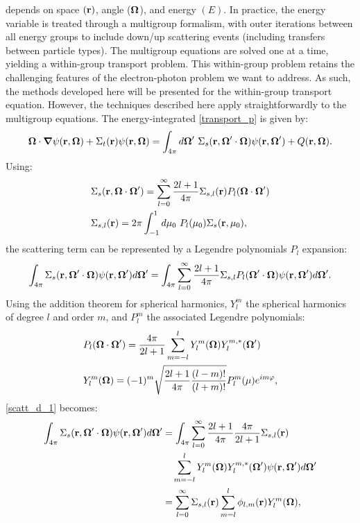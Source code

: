  depends on space $(\mathbf{r})$, angle ($\boldsymbol{\Omega}$), and 
energy $(E)$. In practice, the energy variable is treated through a
multigroup formalism, with outer iterations between all energy groups to
include down/up scattering events (including transfers between particle
types). The multigroup equations are solved one at a time, yielding a
within-group transport problem. This within-group problem retains the 
challenging features of the electron-photon problem we want to address. 
As such, the methods developed here will be presented for the within-group 
transport equation. However, the techniques described here apply 
straightforwardly to the multigroup equations. The energy-integrated 
\cref{transport_p} is given by:
\begin{equation}
\bo\cdot \bn \psi(\br,\bo) + \Sigma_t(\br)\psi(\br,\bo) =
\int_{4\pi}d\bo'\ \Sigma_s(\br,\bo'\cdot\bo)\psi(\br,\bo')+Q(\br,\bo).
\label{transport_p2}
\end{equation}
%
Using:
\begin{align}
  &\Sigma_s(\mathbf{r},\boldsymbol{\Omega}\cdot\boldsymbol{\Omega}') = \sum_{l=0}^{\infty} \frac{2l+1}{4\pi}
  \Sigma_{s,l}(\mathbf{r}) P_l(\boldsymbol{\Omega}\cdot\boldsymbol{\Omega}')\\
  &\Sigma_{s,l}(\mathbf{r}) = 2\pi \int_{-1}^1 d\mu_0\ P_l(\mu_0)
  \Sigma_s(\mathbf{r},\mu_0),
\end{align}
the scattering term can be represented by a Legendre polynomials $P_l$ expansion:
\begin{equation}
  \int_{4\pi} \Sigma_s(\br,\bo'\cdot\bo) \psi(\br,\bo') d\bo' =
  \int_{4\pi} \sum_{l=0}^{\infty} \frac{2l+1}{4\pi} \Sigma_{s,l} P_l(\bo'\cdot\bo)
  \psi(\br,\bo') d\bo'.
  \label{scatt_d_1}
\end{equation}
Using the addition theorem for spherical harmonics, $Y_l^m$ the spherical
harmonics of degree $l$ and order $m$, and $P_l^m$ the associated Legendre
polynomials:
\begin{align}
  & P_l(\boldsymbol{\Omega}\cdot\boldsymbol{\Omega}') = \frac{4\pi}{2l+1} \sum_{m=-l}^l
  Y_l^m(\boldsymbol{\Omega})Y_l^{m,*}(\boldsymbol{\Omega}')\\
  & Y_l^m(\boldsymbol{\Omega}) = (-1)^m \sqrt{\frac{2l+1}{4\pi} \frac{(l-m)!}{(l+m)!}} P_l^m(\mu)
  e^{im\varphi},
\end{align}
\cref{scatt_d_1} becomes:
\begin{equation}
  \begin{split}
    \int_{4\pi} \Sigma_s(\mathbf{r},\boldsymbol{\Omega}'\cdot\boldsymbol{\Omega}) \psi(\mathbf{r},\boldsymbol{\Omega}') d\boldsymbol{\Omega}' &=
    \int_{4\pi} \sum_{l=0}^{\infty} \frac{2l+1}{4\pi}\frac{4\pi}{2l+1}
    \Sigma_{s,l}(\mathbf{r}) \\
    &\quad \sum_{m=-l}^{l} Y_l^m(\boldsymbol{\Omega})Y_l^{m,*}(\boldsymbol{\Omega}') \psi(\mathbf{r},\boldsymbol{\Omega}')d\boldsymbol{\Omega}'\\
    &= \sum_{l=0}^{\infty} \Sigma_{s,l}(\mathbf{r}) \sum_{m=l}^l \phi_{l,m}(\mathbf{r})
    Y_l^m(\boldsymbol{\Omega}),
  \end{split}
\end{equation}
